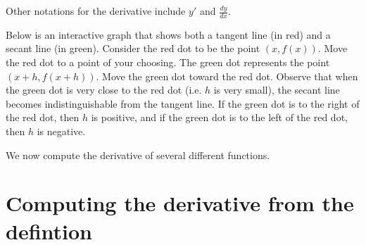 \documentclass{ximera}
\begin{document}
\begin{remark}
Other notations for the derivative include $y'$ and $\frac{dy}{dx}$.\\
\end{remark}

Below is an interactive graph that shows both a tangent line (in red) and a secant line (in green).
Consider the red dot to be the point $(x, f(x))$. Move the red dot to a point of your choosing.
The green dot represents the point $(x+h, f(x+h))$. Move the green dot toward the red dot.
Observe that when the green dot is very close to the red dot (i.e. $h$ is very small), 
the secant line becomes indistinguishable from the tangent line. 
If the green dot is to the right of the red dot, then $h$ is positive, and if the green dot is to the left of 
the red dot, then $h$ is negative.









We now compute the derivative of several different functions.\\

\section{Computing the derivative from the defintion}
\end{document}
